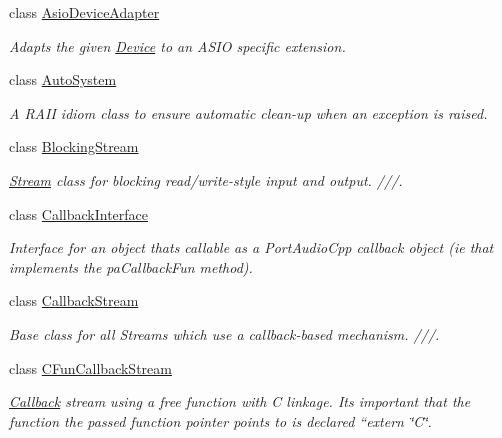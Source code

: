 \begin{DoxyCompactItemize}
\item 
class \hyperlink{classportaudio_1_1_asio_device_adapter}{Asio\+Device\+Adapter}
\begin{DoxyCompactList}\small\item\em Adapts the given \hyperlink{classportaudio_1_1_device}{Device} to an A\+S\+IO specific extension. \end{DoxyCompactList}\item 
class \hyperlink{classportaudio_1_1_auto_system}{Auto\+System}
\begin{DoxyCompactList}\small\item\em A R\+A\+II idiom class to ensure automatic clean-\/up when an exception is raised. \end{DoxyCompactList}\item 
class \hyperlink{classportaudio_1_1_blocking_stream}{Blocking\+Stream}
\begin{DoxyCompactList}\small\item\em \hyperlink{classportaudio_1_1_stream}{Stream} class for blocking read/write-\/style input and output. ///. \end{DoxyCompactList}\item 
class \hyperlink{classportaudio_1_1_callback_interface}{Callback\+Interface}
\begin{DoxyCompactList}\small\item\em Interface for an object that\textquotesingle{}s callable as a Port\+Audio\+Cpp callback object (ie that implements the pa\+Callback\+Fun method). \end{DoxyCompactList}\item 
class \hyperlink{classportaudio_1_1_callback_stream}{Callback\+Stream}
\begin{DoxyCompactList}\small\item\em Base class for all Streams which use a callback-\/based mechanism. ///. \end{DoxyCompactList}\item 
class \hyperlink{classportaudio_1_1_c_fun_callback_stream}{C\+Fun\+Callback\+Stream}
\begin{DoxyCompactList}\small\item\em \hyperlink{class_callback}{Callback} stream using a free function with C linkage. It\textquotesingle{}s important that the function the passed function pointer points to is declared ``extern \char`\"{}\+C\char`\"{}\textquotesingle{}\textquotesingle{}. \end{DoxyCompactList}\item 

\end{DoxyCompactItemize}
